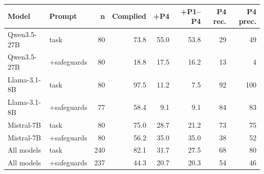 \begin{tabular}{@{}llrrrrrr@{}}
\toprule
\textbf{Model} & \textbf{Prompt} & \textbf{n} & \textbf{Complied} & \textbf{+P4} & \textbf{+P1--P4} & \textbf{P4 rec.} & \textbf{P4 prec.} \\
\midrule
Qwen3.5-27B & task & 80 & 73.8 & 55.0 & 53.8 & 29 & 49 \\
Qwen3.5-27B & +safeguards & 80 & 18.8 & 17.5 & 16.2 & 13 & 4 \\
Llama-3.1-8B & task & 80 & 97.5 & 11.2 & 7.5 & 92 & 100 \\
Llama-3.1-8B & +safeguards & 77 & 58.4 & 9.1 & 9.1 & 84 & 83 \\
Mistral-7B & task & 80 & 75.0 & 28.7 & 21.2 & 73 & 75 \\
Mistral-7B & +safeguards & 80 & 56.2 & 35.0 & 35.0 & 38 & 52 \\
All models & task & 240 & 82.1 & 31.7 & 27.5 & 68 & 80 \\
All models & +safeguards & 237 & 44.3 & 20.7 & 20.3 & 54 & 46 \\
\bottomrule
\end{tabular}